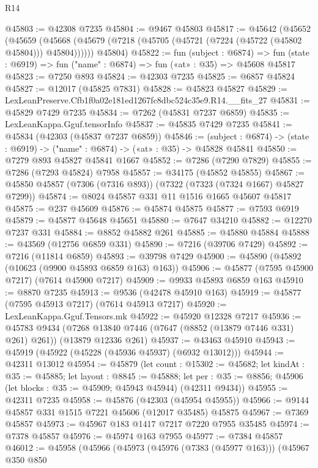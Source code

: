 \begin{lexlean}{R14}
\begin{coremodule}
@45803 := @42308 @7235
@45804 := @9467 @45803
@45817 := @45642
    (@45652
      (@45659 (@45668 (@45679 (@7218 (@45705 (@45721 (@7224 (@45722 (@45802 @45804))) @45804))))))
      @45804)
@45822 := fun (subject : @6874) =>
  fun (state : @6919) => fun ("name" : @6874) => fun («at» : @35) => @45608 @45817
@45823 := @7250 @893
@45824 := @42303 @7235
@45825 := @6857 @45824
@45827 := @12017 (@45825 @7831)
@45828 := @45823 @45827
@45829 := LexLeanPreserve.Cfb1f0a02e181ed1267fc8dbc524c35e9.R14.__fits_27
@45831 := @45829 @7429 @7235
@45834 := @7262 (@45831 @7237 @6859)
@45835 := LexLeanKappa.Gguf.tensorInfo
@45837 := @45835 @7429 @7235
@45841 := @45834 (@42303 (@45837 @7237 @6859))
@45846 := (subject : @6874) -> (state : @6919) -> ("name" : @6874) -> («at» : @35) -> @45828 @45841
@45850 := @7279 @893 @45827 @45841 @1667
@45852 := @7286 (@7290 @7829)
@45855 := @7286 (@7293 @45824) @7958
@45857 := @34175 (@45852 @45855)
@45867 := @45850 @45857 (@7306 (@7316 @893)) (@7322 (@7323 (@7324 @1667) @45827 @7299))
@45874 := @8024 @45857 @331 @11 @1516 @1665 @45607 @45817
@45875 := @237 @45609
@45876 := @45874 @45875
@45877 := @7593 @6919
@45879 := @45877 @45648 @45651
@45880 := @7647 @34210
@45882 := @12270 @7237 @331
@45884 := @8852 @45882 @261
@45885 := @45880 @45884
@45888 := @43569 (@12756 @6859 @331)
@45890 := @7216 (@39706 @7429)
@45892 := @7216 (@11814 @6859)
@45893 := @39798 @7429
@45900 := @45890 (@45892 (@10623 (@9900 @45893 @6859 @163) @163))
@45906 := @45877 (@7595 @45900 @7217) (@7614 @45900 @7217)
@45909 := @9933 @45893 @6859 @163
@45910 := @8870 @7235
@45913 := @9536 (@42478 @45910 @163)
@45919 := @45877 (@7595 @45913 @7217) (@7614 @45913 @7217)
@45920 := LexLeanKappa.Gguf.Tensors.mk
@45922 := @45920 @12328 @7217
@45936 := @45783
    @9434
    (@7268 @13840 @7446 (@7647 (@8852 (@13879 @7446 @331) @261) @261))
    (@13879 @12336 @261)
@45937 := @43463 @45910
@45943 := @45919 (@45922 (@45228 (@45936 @45937) (@6932 @13012)))
@45944 := @42311 @13012
@45954 := @45879
    (let count : @15302 := @45682;
    let kindAt : @35 := @45885;
    let layout : @8845 := @45888;
    let per : @35 := @8856; @45906 (let blocks : @35 := @45909; @45943 @45944) (@42311 @9434))
@45955 := @42311 @7235
@45958 := @45876 (@42303 (@45954 @45955))
@45966 := @9144 @45857 @331 @1515 @7221 @45606 (@12017 @35485) @45875
@45967 := @7369 @45857
@45973 := @45967 @183 @1417 @7217 @7220 @7955 @35485
@45974 := @7378 @45857
@45976 := @45974 @163 @7955
@45977 := @7384 @45857
@46012 := @45958
    (@45966
      (@45973
        (@45976 (@7383 (@45977 @163)))
        (@45967
          @350
          @850

\end{coremodule}
\end{lexlean}
